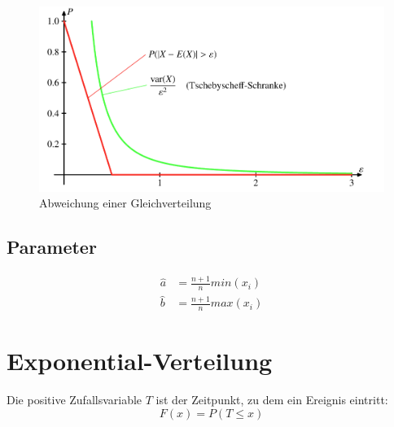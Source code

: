 \documentclass[../Main.tex]{subfiles}
\begin{document}
\begin{figure}[H]
    \centering
    \includegraphics[width=0.75\linewidth]{Images/gleichverteilung-abweichung.png}
    \caption{Abweichung einer Gleichverteilung}
\end{figure}


\subsection{Parameter}
\begin{equation}
    \begin{split}
        \hat{a} &= \frac{n+1}{n} min(x_i) \\
        \hat{b} &= \frac{n+1}{n} max(x_i)
    \end{split}
\end{equation}

\newpage

\section{Exponential-Verteilung}
Die positive Zufallsvariable \(T\) ist der Zeitpunkt, zu dem ein Ereignis eintritt:
\begin{equation*}
    F(x) = P(T \leq x)
\end{equation*}
\end{document}
